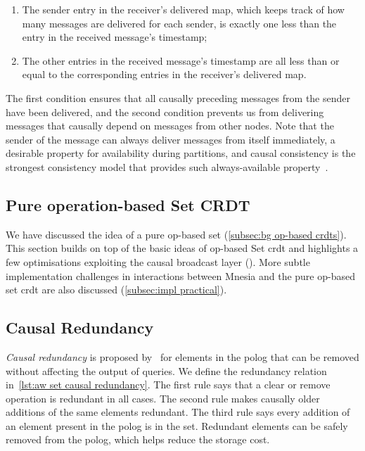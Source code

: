 \begin{enumerate}
  \item The sender entry in the receiver's delivered map, which keeps track of how many
  messages are delivered for each sender, is exactly one less than the entry
  in the received message's timestamp;
  \item The other entries in the received message's timestamp are all less than
  or equal to the corresponding entries in the receiver's delivered map.
\end{enumerate}

The first condition ensures that all causally preceding messages from the sender
have been delivered, and the second condition prevents us from delivering 
messages that causally depend on messages from other nodes. Note that the sender 
of the message can always deliver messages from itself immediately, a desirable 
property for
availability during partitions, and causal consistency is the strongest consistency
model that provides such always-available property~\cite{mahajan2012cac}.

\subsection{Pure operation-based Set CRDT} \label{sec:impl pawset}

We have discussed the idea of a pure op-based set (\cref{subsec:bg op-based crdts}). 
This section builds on top of the basic
ideas of op-based Set \acrshort{crdt} and highlights 
a few optimisations exploiting the causal broadcast 
layer ().
More subtle implementation challenges in interactions
between Mnesia and the pure op-based set \acrshort{crdt} are also 
discussed (\cref{subsec:impl practical}).

\subsection{Causal Redundancy} \label{subsec:impl causal redundancy}

\emph{Causal redundancy} is proposed by~\citet{baquero2017PureOp} for elements in
the \acrshort{polog} that can be removed without affecting the output of
queries. We define the
redundancy relation in~\cref{lst:aw set causal redundancy}. The first rule
says that a clear or remove operation is redundant in all cases. The second rule
makes causally older additions of the same elements redundant. The third rule says every
addition of an element present in the \acrshort{polog} is in the set. Redundant
elements can be safely removed from the \acrshort{polog}, which helps reduce the
storage cost.


